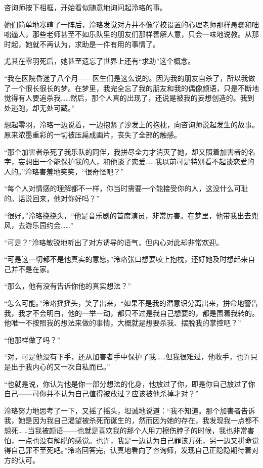 \documentclass[UTF8, scheme = chinese, openany]{ctexbook}
\begin{document}
咨询师按下相框，开始看似随意地询问起泠珞的事。

她们简单地寒暄了一阵后，泠珞发觉对方并不像学校设置的心理老师那样愚蠢和咄咄逼人，那些老师甚至不如乐队里的朋友们那样善解人意，只会一味地说教。从那时起，她就不再认为，求助是一件有用的事情了。

尤其在零羽死后，她甚至遗忘了世界上还有“求助”这个概念。

“我在医院昏迷了八个月——医生们是这么说的。因为我的朋友自杀了，所以我做了一个很长很长的梦。在梦里，我完全忘了我的朋友和我的偶像颜语，只是不断地觉得有人要追杀我……然后，那个人真的出现了，还说是被我的妄想创造的。我到处逃跑，却无处可藏。”

想起零羽，泠珞一边说着，一边抱紧了沙发上的抱枕，向咨询师说起发生的故事。原来浓墨重彩的一切被压扁成画片，丧失了全部的触感。

“那个加害者杀死了我乐队的同伴，我拼尽全力才消灭了她，却又照着加害者的名字，妄想出一个能保护我的人，和他谈了恋爱……我以前可是特别看不起谈恋爱的人的。”泠珞害羞地笑笑，“很奇怪吧？”

“每个人对情感的理解都不一样，你当时需要一个能接受你的人，这没什么可耻的。话说回来，他对你好吗？”

“很好。”泠珞挠挠头，“他是音乐剧的首席演员，非常厉害。在梦里，他带我出去兜风，去游乐园约会……”

“可是？”泠珞敏锐地听出了对方诱导的语气，但内心对此却非常欢迎。

“可是这一切都不是他真实的意愿。”泠珞张口想要咬上抱枕，还好她及时想起来自己并不是在家。

“那么，他有没有告诉你他的真实想法？”

“怎么可能。”泠珞摇摇头，笑了出来，“如果不是我的潜意识分离出来，拼命地警告我，我才不会明白，他的一举一动，都只不过是我自己想要的，都是围着我转的。他唯一不按照我的想法来做的事情，大概就是想要杀我、摆脱我的掌控吧？”

“他那样做了吗？”

“对，可是他没有下手，还从加害者手中保护了我……但我很难过，他收手，也许只是出于我内心的又一次自私而已。”

“也就是说，你认为他是你一部分想法的化身，他放过了你，即是你自己放过了你自己——可你并不认为自己值得被放过？应该被他杀掉才对？”

泠珞努力地思考了一下，又摇了摇头，坦诚地说道：“我不知道。那个加害者告诉我，她是因为我自己渴望被杀死而诞生的，然而因为她的存在，我发现我一点都不想死……当我被颜语——也就是喜欢我的那个人用刀擦伤脖子的时候，我也非常害怕，一点也没有解脱的感觉。也许，我是一边认为自己罪该万死，另一边又拼命觉得自己罪不至死吧。”泠珞回答完，认真地看向了咨询师，发现自己正隐隐期待着对方的认可。
\end{document}
